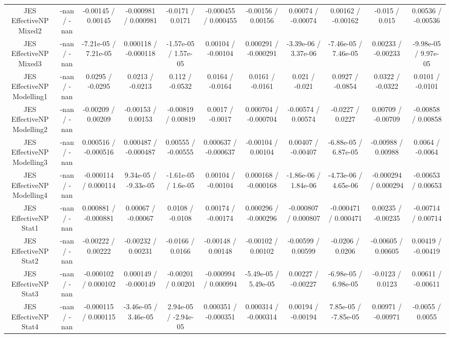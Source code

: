 \begin{table}[htbp]
\begin{center}
\begin{tabular}{|c|c|c|c|c|c|c|c|c|c|c|}
  JES EffectiveNP Mixed2 & -nan / -nan & -0.00145 / 0.00145 & -0.000981 / 0.000981 & -0.0171 / 0.0171 & -0.000455 / 0.000455 & -0.00156 / 0.00156 & 0.00074 / -0.00074 & 0.00162 / -0.00162 & -0.015 / 0.015 & 0.00536 / -0.00536 \\ 
  JES EffectiveNP Mixed3 & -nan / -nan & -7.21e-05 / 7.21e-05 & 0.000118 / -0.000118 & -1.57e-05 / 1.57e-05 & 0.00104 / -0.00104 & 0.000291 / -0.000291 & -3.39e-06 / 3.37e-06 & -7.46e-05 / 7.46e-05 & 0.00233 / -0.00233 & -9.98e-05 / 9.97e-05 \\ 
  JES EffectiveNP Modelling1 & -nan / -nan & 0.0295 / -0.0295 & 0.0213 / -0.0213 & 0.112 / -0.0532 & 0.0164 / -0.0164 & 0.0161 / -0.0161 & 0.021 / -0.021 & 0.0927 / -0.0854 & 0.0322 / -0.0322 & 0.0101 / -0.0101 \\ 
  JES EffectiveNP Modelling2 & -nan / -nan & -0.00209 / 0.00209 & -0.00153 / 0.00153 & -0.00819 / 0.00819 & 0.0017 / -0.0017 & 0.000704 / -0.000704 & -0.00574 / 0.00574 & -0.0227 / 0.0227 & 0.00709 / -0.00709 & -0.00858 / 0.00858 \\ 
  JES EffectiveNP Modelling3 & -nan / -nan & 0.000516 / -0.000516 & 0.000487 / -0.000487 & 0.00555 / -0.00555 & 0.000637 / -0.000637 & -0.00104 / 0.00104 & 0.00407 / -0.00407 & -6.88e-05 / 6.87e-05 & -0.00988 / 0.00988 & 0.0064 / -0.0064 \\ 
  JES EffectiveNP Modelling4 & -nan / -nan & -0.000114 / 0.000114 & 9.34e-05 / -9.33e-05 & -1.61e-05 / 1.6e-05 & 0.00104 / -0.00104 & 0.000168 / -0.000168 & -1.86e-06 / 1.84e-06 & -4.73e-06 / 4.65e-06 & -0.000294 / 0.000294 & -0.00653 / 0.00653 \\ 
  JES EffectiveNP Stat1 & -nan / -nan & 0.000881 / -0.000881 & 0.00067 / -0.00067 & 0.0108 / -0.0108 & 0.00174 / -0.00174 & 0.000296 / -0.000296 & -0.000807 / 0.000807 & -0.000471 / 0.000471 & 0.00235 / -0.00235 & -0.00714 / 0.00714 \\ 
  JES EffectiveNP Stat2 & -nan / -nan & -0.00222 / 0.00222 & -0.00232 / 0.00231 & -0.0166 / 0.0166 & -0.00148 / 0.00148 & -0.00102 / 0.00102 & -0.00599 / 0.00599 & -0.0206 / 0.0206 & -0.00605 / 0.00605 & 0.00419 / -0.00419 \\ 
  JES EffectiveNP Stat3 & -nan / -nan & -0.000102 / 0.000102 & 0.000149 / -0.000149 & -0.00201 / 0.00201 & -0.000994 / 0.000994 & -5.49e-05 / 5.49e-05 & 0.00227 / -0.00227 & -6.98e-05 / 6.98e-05 & -0.0123 / 0.0123 & 0.00611 / -0.00611 \\ 
  JES EffectiveNP Stat4 & -nan / -nan & -0.000115 / 0.000115 & -3.46e-05 / 3.46e-05 & 2.94e-05 / -2.94e-05 & 0.000351 / -0.000351 & 0.000314 / -0.000314 & 0.00194 / -0.00194 & 7.85e-05 / -7.85e-05 & 0.00971 / -0.00971 & -0.0055 / 0.0055 \\ 

\end{tabular}
\end{center}
\end{table}
